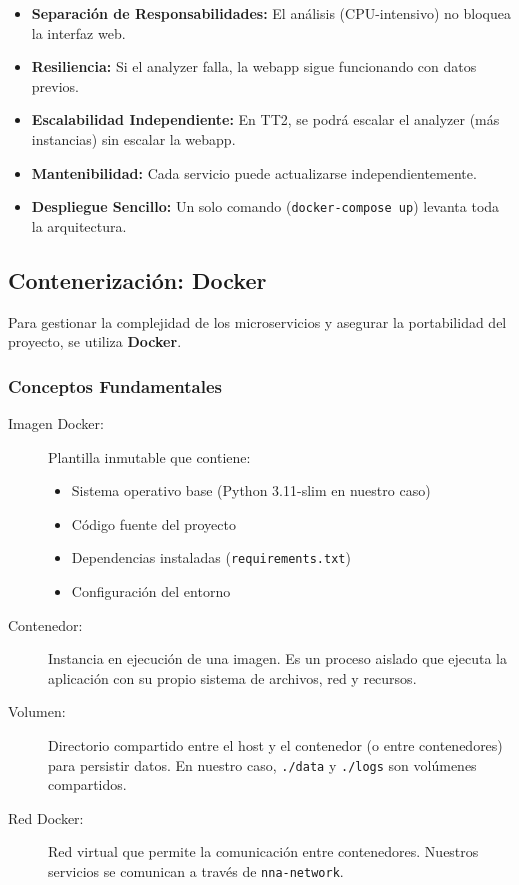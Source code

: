 \begin{itemize}
    \item \textbf{Separación de Responsabilidades:} El análisis (CPU-intensivo) no bloquea la interfaz web.
    \item \textbf{Resiliencia:} Si el analyzer falla, la webapp sigue funcionando con datos previos.
    \item \textbf{Escalabilidad Independiente:} En TT2, se podrá escalar el analyzer (más instancias) sin escalar la webapp.
    \item \textbf{Mantenibilidad:} Cada servicio puede actualizarse independientemente.
    \item \textbf{Despliegue Sencillo:} Un solo comando (\texttt{docker-compose up}) levanta toda la arquitectura.
\end{itemize}

\subsection{Contenerización: Docker}
\label{subsec:docker}

Para gestionar la complejidad de los microservicios y asegurar la portabilidad del proyecto, se utiliza \textbf{Docker}.

\subsubsection{Conceptos Fundamentales}
\label{subsubsec:conceptos_docker}

\begin{description}
    \item[Imagen Docker:] Plantilla inmutable que contiene:
    \begin{itemize}
        \item Sistema operativo base (Python 3.11-slim en nuestro caso)
        \item Código fuente del proyecto
        \item Dependencias instaladas (\texttt{requirements.txt})
        \item Configuración del entorno
    \end{itemize}
    
    \item[Contenedor:] Instancia en ejecución de una imagen. Es un proceso aislado que ejecuta la aplicación con su propio sistema de archivos, red y recursos.
    
    \item[Volumen:] Directorio compartido entre el host y el contenedor (o entre contenedores) para persistir datos. En nuestro caso, \texttt{./data} y \texttt{./logs} son volúmenes compartidos.
    
    \item[Red Docker:] Red virtual que permite la comunicación entre contenedores. Nuestros servicios se comunican a través de \texttt{nna-network}.
\end{description}

